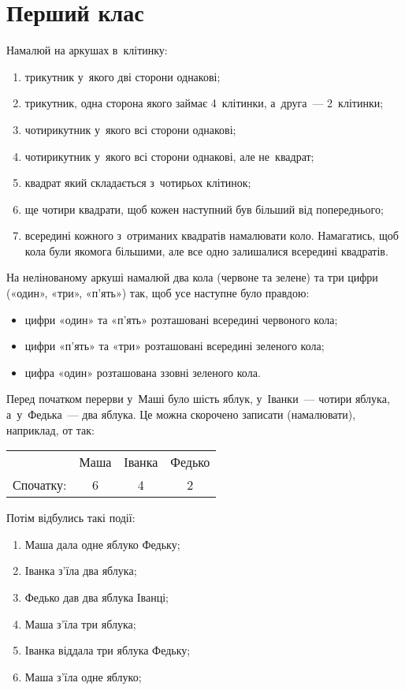 \chapter{Перший клас}


\problem
Намалюй на аркушах в~клітинку:
\begin{enumerate}
    \item трикутник у~якого дві сторони однакові;
    \item трикутник, одна сторона якого займає 4~клітинки, а~друга~---
    2~клітинки;
    \item чотирикутник у~якого всі сторони однакові;
    \item чотирикутник у~якого всі сторони однакові, але не~квадрат;
    \item квадрат який складається з~чотирьох клітинок;
    \item ще чотири квадрати, щоб кожен наступний був більший від попереднього;
    \item всередині кожного з~отриманих квадратів намалювати коло.
    Намагатись, щоб кола були якомога більшими,
    але все одно залишалися всередині квадратів.
\end{enumerate}


\problem
На нелінованому аркуші намалюй два кола (червоне та зелене)
та три цифри («один», «три», «п'ять») так,
щоб усе наступне було правдою:
\begin{itemize}
    \item цифри «один» та «п'ять» розташовані всередині червоного кола;
    \item цифри «п'ять» та «три» розташовані всередині зеленого кола;
    \item цифра «один» розташована ззовні зеленого кола.
\end{itemize}


\problem
Перед початком перерви у~Маші було шість яблук,
у~Іванки~--- чотири яблука, а~у~Федька~--- два яблука.
Це можна скорочено записати (намалювати), наприклад, от так:

\medskip

\begin{tabular}{rccc}
& Маша & Іванка & Федько \\
Спочатку: & 6 & 4 & 2 \\
\end{tabular}

\medskip

Потім відбулись такі події:
\begin{enumerate}
    \item Маша дала одне яблуко Федьку;
    \item Іванка з'їла два яблука;
    \item Федько дав два яблука Іванці;
    \item Маша з'їла три яблука;
    \item Іванка віддала три яблука Федьку;
    \item Маша з'їла одне яблуко;
\end{enumerate}

